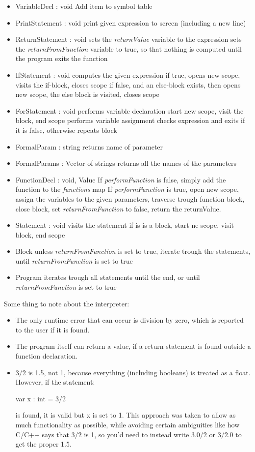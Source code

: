 \begin{itemize}
	\item VariableDecl : void
		\subitem Add item to symbol table
	\item PrintStatement : void
		\subitem print given expression to screen (including a new line)
	\item ReturnStatement : void
		\subitem sets the \textit{returnValue} variable to the expression
		\subitem sets the \textit{returnFromFunction} variable to true, so that nothing is computed until the program exits the function
	\item IfStatement : void
		\subitem computes the given expression
		\subitem if true, opens new scope, visits the if-block, closes scope
		\subitem if false, and an else-block exists, then opens new scope, the else block is visited, closes scope
	\item ForStatement : void
		\subitem performs variable declaration
		\subitem start new scope, visit the block, end scope
		\subitem performs variable assignment
		\subitem checks expression and exits if it is false, otherwise repeats block
	\item FormalParam : string
		\subitem returns name of parameter
	\item FormalParams : Vector of strings
		\subitem returns all the names of the parameters
	\item FunctionDecl : void, Value
		\subitem If \textit{performFunction} is false, simply add the function to the \textit{functions} map
		\subitem If \textit{performFunction} is true, open new scope, assign the variables to the given parameters, traverse trough function block, close block, set \textit{returnFromFunction} to false, return the returnValue.
	\item Statement : void
		\subitem visits the statement
		\subitem if is is a block, start ne scope, visit block, end scope
	\item Block
		\subitem unless \textit{returnFromFunction} is set to true, iterate trough the statements, until \textit{returnFromFunction} is set to true
	\item Program
		\subitem iterates trough all statements until the end, or until \textit{returnFromFunction} is set to true
\end{itemize}

Some thing to note about the interpreter:
\begin{itemize}
	\item The only runtime error that can occur is division by zero, which is reported to the user if it is found.
	\item The program itself can return a value, if a return statement is found outside a function declaration.
	\item 3/2 is 1.5, not 1, because everything (including booleans) is treated as a float. However, if the statement:
	\begin{center}var x : int = 3/2 \end{center}
	is found, it is valid but x is set to 1. This approach was taken to allow as much functionality as possible, while avoiding certain ambiguities like how C/C++ says that 3/2 is 1, so you'd need to instead write 3.0/2 or 3/2.0 to get the proper 1.5.
\end{itemize}

